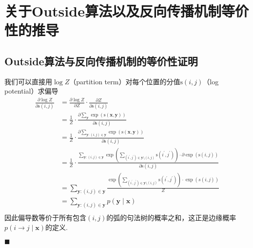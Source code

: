 \chapter{关于Outside算法以及反向传播机制等价性的推导}

\section{Outside算法与反向传播机制的等价性证明}\label{sec:outside-backprop}
我们可以直接用$\log Z$（partition term）对每个位置的分值$\mathrm{s}(i, j)$（log potential）求偏导
\begin{equation}
    \label{eq:partial-derivative}
    \begin{split}
        \frac{\partial \log Z}{\partial \mathrm{s}(i, j)} & = \frac{\partial \log Z}{\partial Z} \cdot \frac{\partial Z}{\partial \mathrm{s}(i, j)}\\
        & =\frac{1}{Z} \cdot \frac{\partial \sum_{\boldsymbol{y}} \exp \left(\mathrm{s}(\boldsymbol{x}, \boldsymbol{y}) \right)}{\partial \mathrm{s}(i, j)}\\
        & =\frac{1}{Z} \cdot \frac{\partial \sum_{\boldsymbol{y}:(i,j) \in \boldsymbol{{y}}} \exp \left(\mathrm{s}(\boldsymbol{x}, \boldsymbol{y}) \right)}{\partial \mathrm{s}(i, j)}\\
        & =\frac{1}{Z} \cdot \frac{\sum_{\boldsymbol{y}:(i,j) \in \boldsymbol{{y}}} \exp \left( \sum_{(i^{\prime}, j^{\prime}) \in \boldsymbol{y}\setminus (i,j)} \mathrm{s}(i^{\prime}, j^{\prime}) \right)\cdot \partial \exp(\mathrm{s}(i, j))}{\partial \mathrm{s}(i, j)}\\
        & =\sum_{\boldsymbol{y}:(i,j) \in \boldsymbol{{y}}} \frac{\exp \left( \sum_{(i^{\prime}, j^{\prime}) \in \boldsymbol{y}\setminus (i,j)} \mathrm{s}(i^{\prime}, j^{\prime})\right)\cdot \exp(s(i,j))}{Z}\\
        &= \sum_{\boldsymbol{y}:(i,j) \in \boldsymbol{{y}}} p(\boldsymbol{y}\mid\boldsymbol{x})\\
    \end{split}
\end{equation}
因此偏导数等价于所有包含$(i,j)$的弧的句法树的概率之和，这正是边缘概率$p(i \rightarrow j\mid\boldsymbol{x})$的定义.

\noindent$\blacksquare$


